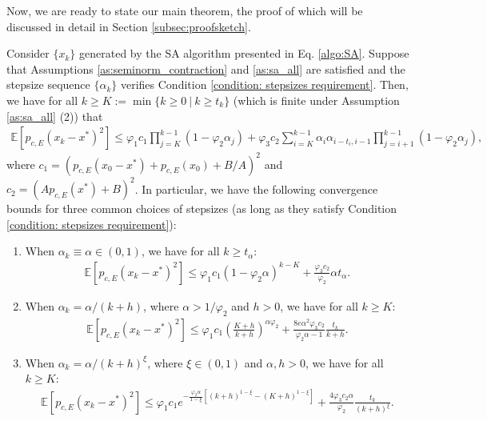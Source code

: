 \documentclass[11 pt]{article}
\begin{document}
	Now, we are ready to state our main theorem, the proof of which will be discussed in detail in Section \ref{subsec:proofsketch}.
	
	\begin{theorem}\label{thm:SA_finite}
		Consider $\{x_k\}$ generated by the SA algorithm presented in Eq. \eqref{algo:SA}. Suppose that Assumptions \ref{as:seminorm_contraction} and \ref{as:sa_all} are satisfied and the stepsize sequence $\{\alpha_k\}$ verifies Condition \ref{condition: stepsizes requirement}. Then, we have for all $k\geq K:= \min\{k\geq 0 ~|~ k \geq t_k\}$ (which is finite under Assumption \ref{as:sa_all} (2)) that
		\begin{align}
			\label{eq:general finite-sample bound}
			\mathbb{E}\left[p_{c,E}(x_k-x^*)^2\right]\leq   \varphi_1c_1\prod_{j=K}^{k-1}(1-\varphi_2\alpha_j)+\varphi_3c_2\sum_{i=K}^{k-1}\alpha_i\alpha_{i-t_i,i-1}\prod_{j=i+1}^{k-1}(1-\varphi_2\alpha_j),
		\end{align}
		where $c_1=\left(p_{c,E}(x_0-x^*)+p_{c,E}(x_0)+B/A\right)^2$ and $c_2=\left(Ap_{c,E}(x^*)+B\right)^2$.
		In particular, we have the following convergence bounds for three common choices of stepsizes (as long as they satisfy Condition \ref{condition: stepsizes requirement}):
		\begin{enumerate}[(1)]
			\item When $\alpha_k \equiv \alpha\in (0,1)$, we have for all $k \geq t_\alpha$:
			\begin{equation*}
				\begin{split}
					\mathbb{E}[p_{c,E}(x_{k}-x^*)^2] \leq \varphi_1 c_1 (1 - \varphi_2 \alpha)^{k-K} + \frac{\varphi_3c_2 }{\varphi_2} \alpha t_\alpha.
				\end{split}
			\end{equation*}
			\item When $\alpha_k = \alpha/(k + h)$, where $\alpha > 1/\varphi_2$ and $h > 0$, we have for all $k \geq K$:
			\begin{equation*}
				\begin{split}
					\mathbb{E}[p_{c,E}(x_{k}-x^*)^2] \leq \varphi_1 c_1 \left(\frac{K+h}{k + h}\right)^{\alpha \varphi_2} + \frac{8e\alpha^2\varphi_3c_2}{\varphi_2\alpha - 1} \frac{t_k}{k + h}.
				\end{split}
			\end{equation*}
			\item When $\alpha_k = \alpha/(k + h)^\xi$, where $\xi \in (0, 1)$ and $\alpha,h > 0$, we have for all $k \geq K$:
			\begin{equation*}
				\begin{split}
					\mathbb{E}[p_{c,E}(x_{k}-x^*)^2] \leq \varphi_1 c_1 e^{-\frac{\varphi_2 \alpha}{1-\xi}\left[(k+h)^{1-\xi} - (K+h)^{1-\xi}\right]} + \frac{4\varphi_3c_2 \alpha}{\varphi_2} \frac{t_k}{(k + h)^\xi}.
				\end{split}
			\end{equation*} 
		\end{enumerate}
	\end{theorem}
	
\end{document}
